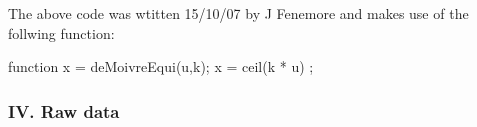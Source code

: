 The above code was wtitten 15/10/07 by J Fenemore and makes use of the follwing function:
\begin{VrbM}
function x = deMoivreEqui(u,k);
%
%
%
%
%
x = ceil(k * u) ; %
\end{VrbM}
\subsubsection*{IV. Raw data}
